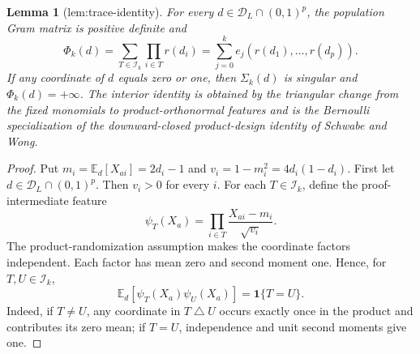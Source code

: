 \documentclass{article}
\newtheorem{lemma}{Lemma}
\begin{document}
\begin{lemma}[lem:trace-identity]\label{lem:trace-identity}
For every \(d\in\mathcal D_L\cap(0,1)^p\), the population Gram matrix is positive definite and \[\Phi_k(d)=\sum_{T\in\mathcal I_k}\prod_{i\in T}r(d_i)=\sum_{j=0}^{k}e_j(r(d_1),\ldots,r(d_p)).\] If any coordinate of \(d\) equals zero or one, then \(\Sigma_k(d)\) is singular and \(\Phi_k(d)=+\infty\). The interior identity is obtained by the triangular change from the fixed monomials to product-orthonormal features and is the Bernoulli specialization of the downward-closed product-design identity of Schwabe and Wong.
\end{lemma}
\begin{proof}
Put \(m_i=\mathbb E_d[X_{ai}]=2d_i-1\) and \(v_i=1-m_i^2=4d_i(1-d_i)\).  First let \(d\in\mathcal D_L\cap(0,1)^p\).  Then \(v_i>0\) for every \(i\).  For each \(T\in\mathcal I_k\), define the proof-intermediate feature
\[
 \psi_T(X_a)=\prod_{i\in T}\frac{X_{ai}-m_i}{\sqrt{v_i}}.
\]
The product-randomization assumption makes the coordinate factors independent.  Each factor has mean zero and second moment one.  Hence, for \(T,U\in\mathcal I_k\),
\[
 \mathbb E_d[\psi_T(X_a)\psi_U(X_a)]=\mathbf 1\{T=U\}.
\]
Indeed, if \(T\ne U\), any coordinate in \(T\mathbin\triangle U\) occurs exactly once in the product and contributes its zero mean; if \(T=U\), independence and unit second moments give one.


\end{proof}
\end{document}
